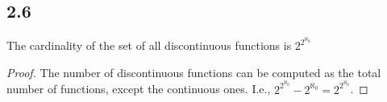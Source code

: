 \subsection*{2.6} The cardinality of the set of all discontinuous functions is $2^{2^{\aleph_0}}$

\begin{proof}
    The number of discontinuous functions can be computed as the total number of functions, except the continuous ones. I.e., $2^{2^{\aleph_0}} - 2^{\aleph_0} = 2^{2^{\aleph_0}}$.
\end{proof}


